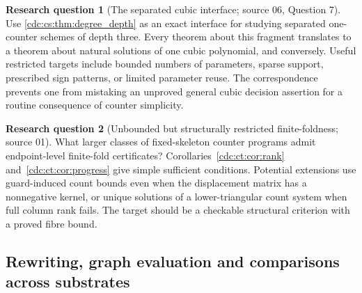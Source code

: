 \documentclass[11pt,a4paper]{article}
\theoremstyle{definition}
\newtheorem{question}[question]{Research question}
\theoremstyle{remark}
\begin{document}
\begin{question}[The separated cubic interface; source 06, Question 7]
Use \cref{cdc:cs:thm:degree_depth} as an exact interface for
studying separated one-counter schemes of depth three. Every theorem about
this fragment translates to a theorem about natural solutions of one cubic
polynomial, and conversely. Useful restricted targets include bounded numbers
of parameters, sparse support, prescribed sign patterns, or limited parameter
reuse. The correspondence prevents one from mistaking an unproved general
cubic decision assertion for a routine consequence of counter simplicity.
\end{question}

\begin{question}[Unbounded but structurally restricted finite-foldness; source 01]
What larger classes of fixed-skeleton counter programs admit endpoint-level finite-fold certificates? Corollaries~\ref{cdc:ct:cor:rank} and~\ref{cdc:ct:cor:progress} give simple sufficient conditions. Potential extensions use guard-induced count bounds even when the displacement matrix has a nonnegative kernel, or unique solutions of a lower-triangular count system when full column rank fails. The target should be a checkable structural criterion with a proved fibre bound.
\end{question}

\subsection{Rewriting, graph evaluation and comparisons across substrates}
\end{document}

